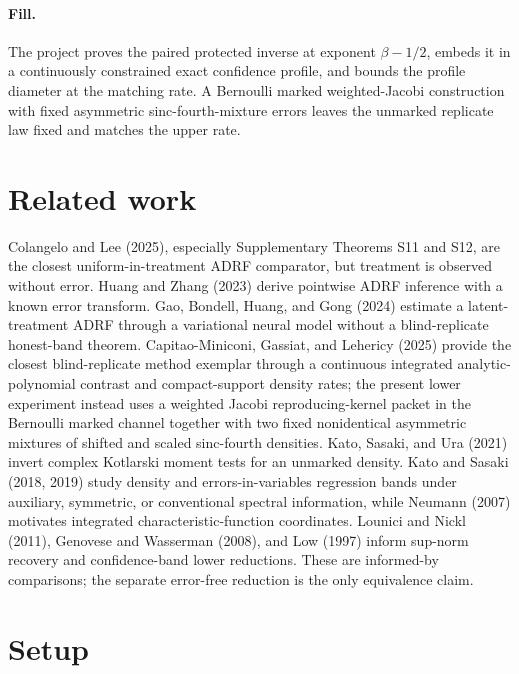 \documentclass{article}
\begin{document}
\paragraph{Fill.} The project proves the paired protected inverse at exponent \(\beta-1/2\), embeds it in a continuously constrained exact confidence profile, and bounds the profile diameter at the matching rate. A Bernoulli marked weighted-Jacobi construction with fixed asymmetric sinc-fourth-mixture errors leaves the unmarked replicate law fixed and matches the upper rate.

\section{Related work}

Colangelo and Lee (2025), especially Supplementary Theorems S11 and S12, are the closest uniform-in-treatment ADRF comparator, but treatment is observed without error. Huang and Zhang (2023) derive pointwise ADRF inference with a known error transform. Gao, Bondell, Huang, and Gong (2024) estimate a latent-treatment ADRF through a variational neural model without a blind-replicate honest-band theorem. Capitao-Miniconi, Gassiat, and Lehericy (2025) provide the closest blind-replicate method exemplar through a continuous integrated analytic-polynomial contrast and compact-support density rates; the present lower experiment instead uses a weighted Jacobi reproducing-kernel packet in the Bernoulli marked channel together with two fixed nonidentical asymmetric mixtures of shifted and scaled sinc-fourth densities. Kato, Sasaki, and Ura (2021) invert complex Kotlarski moment tests for an unmarked density. Kato and Sasaki (2018, 2019) study density and errors-in-variables regression bands under auxiliary, symmetric, or conventional spectral information, while Neumann (2007) motivates integrated characteristic-function coordinates. Lounici and Nickl (2011), Genovese and Wasserman (2008), and Low (1997) inform sup-norm recovery and confidence-band lower reductions. These are informed-by comparisons; the separate error-free reduction is the only equivalence claim.

\section{Setup}
\end{document}
